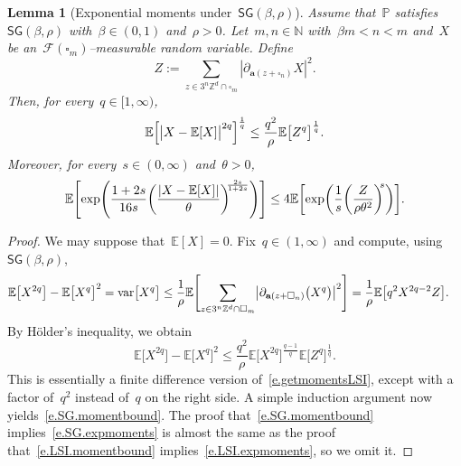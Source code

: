 \documentclass[11pt,twoside]{article} %
\let\oldsquare\square %
\renewcommand{\square}{\oldsquare}
\numberwithin{equation}{section}
\newtheorem{lemma}[theorem]{Lemma}
\theoremstyle{definition}
\let\originalleft\left
\let\originalright\right
\renewcommand{\left}{\mathopen{}\mathclose\bgroup\originalleft}
\renewcommand{\right}{\aftergroup\egroup\originalright}
\newcommand*{\N}{\ensuremath{\mathbb{N}}}
\newcommand*{\Zd}{\ensuremath{\mathbb{Z}^d}}
\renewcommand{\a}{\mathbf{a}}
\newcommand{\cu}{\square}
\newcommand{\F}{\mathcal{F}}
\renewcommand{\P}{\mathbb{P}}
\newcommand{\E}{\mathbb{E}}
\DeclareMathOperator{\var}{var}
\newcommand{\SG}{\mathsf{SG}}
\begin{document}
\begin{lemma}[Exponential moments under~$\SG(\beta,\rho)$] 
\label{l.SG.moments}
Assume that~$\P$ satisfies~$\SG(\beta,\rho)$ with~$\beta \in (0,1)$ and~$\rho>0$. Let~$m,n\in\N$ with~$\beta m < n < m$  and~$X$ be an~$\F(\cu_m)$--measurable random variable. Define
\begin{equation}
\label{e.Zderv.again.2}
Z := \sum_{z\in3^n\Zd\cap \cu_m} |  \partial_{\a(z+\cu_n)} X|^2.
\end{equation}
Then, for every~$q\in [1,\infty)$, 
\begin{align}
\label{e.SG.momentbound}
\E \left[ \big| X - \E[X] \big|^{2q} \right]^{\frac1{q}}
\leq 
\frac{q^2}{\rho} \E \bigl[  Z^{q} \bigr]^{\frac1{q}}.
\end{align}
Moreover, for every~$s\in (0,\infty)$ and~$\theta>0$, 
\begin{align}
\label{e.SG.expmoments}
\E \left[ \exp\Biggl( \frac{1+2s}{16s}\biggl( \frac{ \left| X - \E[X] \right|}{\theta} \biggr)^{\!\!\frac{2s}{1+2s}} \Biggr) \right]
\leq 
4 \E \left[ \exp\biggl( \frac1{s} \left( \frac{Z}{\rho\theta^2}  \biggr)^{\!\!s} \right) \right].
\end{align}
\end{lemma}
\begin{proof}
We may suppose that~$\E[X]=0$. 
Fix~$q\in (1,\infty)$ and compute, using~$\SG(\beta,\rho)$, 
\begin{align*}
\E \bigl[  X^{2q} \bigr] - \E \bigl[  X^{q} \bigr]^2 
=
\var \bigl[  X^q \bigr]
& 
\leq
\frac1\rho 
\E \Biggl[
\sum_{z\in 3^n\Zd \cap \cu_m}
\left| \partial_{\a(z+\cu_n)} \bigl( X^q \bigr)
\right|^2
\Biggr]
=
\frac1\rho \E \left[ q^2 X^{2q-2} Z \right].
\end{align*}
By H\"older's inequality, we obtain
\begin{equation*}
\E \bigl[  X^{2q} \bigr] - \E \bigl[  X^{q} \bigr]^2 
\leq
\frac{q^2} \rho 
\E \bigl[  X^{2q} \bigr]^{\frac{q-1}{q}} \E \bigl[  Z^{q} \bigr]^{\frac1q}.
\end{equation*}
This is essentially a finite difference version of~\eqref{e.getmomentsLSI}, except with a factor of~$q^2$ instead of~$q$ on the right side. A simple induction argument now yields~\eqref{e.SG.momentbound}. 
The proof that~\eqref{e.SG.momentbound} implies~\eqref{e.SG.expmoments} is almost the same as the proof that~\eqref{e.LSI.momentbound} implies~\eqref{e.LSI.expmoments}, so we omit it.
\end{proof}
\end{document}
